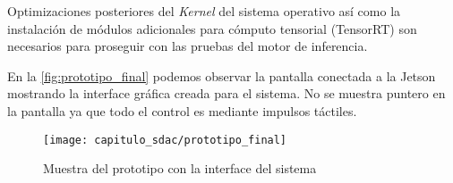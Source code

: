 Optimizaciones posteriores del \emph{Kernel} del sistema operativo así como la
instalación de módulos adicionales para cómputo tensorial (TensorRT) son
necesarios para proseguir con las pruebas del motor de inferencia.

En la \autoref{fig:prototipo_final} podemos observar la pantalla conectada a la
Jetson mostrando la interface gráfica creada para el sistema. No se muestra
puntero en la pantalla ya que todo el control es mediante impulsos táctiles.

\begin{figure}[H]
    \centering
    \texttt{[image: capitulo\_sdac/prototipo\_final]}
    \caption{Muestra del prototipo con la interface del sistema}\label{fig:prototipo_final}
\end{figure}
